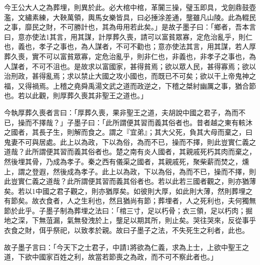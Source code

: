 \begin{pinyinscope}
今王公大人之為葬埋，則異於此。必大棺中棺，革闠三操，璧玉即具，戈劍鼎鼓壺濫，文繡素練，大鞅萬領，輿馬女樂皆具，曰必捶涂差通，壟雖凡山陵。此為輟民之事，靡民之財，不可勝計也，其為毋用若此矣。」是故子墨子曰：「鄉者，吾本言曰，意亦使法1其言，用其謀，計厚葬久喪，請可以富貧眾寡，定危治亂乎，則仁也，義也，孝子之事也，為人謀者，不可不勸也；意亦使法其言，用其謀，若人厚葬久喪，實不可以富貧眾寡，定危治亂乎，則非仁也，非義也，非孝子之事也，為人謀者，不可不沮也。是故求以富國家，甚得貧焉；欲以眾人民，甚得寡焉；欲以治刑政，甚得亂焉；求以禁止大國之攻小國也，而既已不可矣；欲以干上帝鬼神之福，又得禍焉。上稽之堯舜禹湯文武之道而政逆之，下稽之桀紂幽厲之事，猶合節也。若以此觀，則厚葬久喪其非聖王之道也。」

今執厚葬久喪者言曰：「厚葬久喪，果非聖王之道，夫胡說中國之君子，為而不已，操而不擇哉？」子墨子曰：「此所謂便其習而義其俗者也。昔者越之東有輆沐之國者，其長子生，則解而食之。謂之『宜弟』；其大父死，負其大母而棄之，曰鬼妻不可與居處。此上以為政，下以為俗，為而不已，操而不擇，則此豈實仁義之道哉？此所謂便其習而義其俗者也。楚之南有炎人國者，其親戚死朽其肉而棄之，然後埋其骨，乃成為孝子。秦之西有儀渠之國者，其親戚死，聚柴薪而焚之，燻上，謂之登遐，然後成為孝子。此上以為政，下以為俗，為而不已，操而不擇，則此豈實仁義之道哉？此所謂便其習而義其俗者也。若以此若三國者觀之，則亦猶薄矣。若以1中國之君子觀之，則亦猶厚矣。如彼則大厚，如此則大薄，然則葬埋之有節矣。故衣食者，人之生利也，然且猶尚有節；葬埋者，人之死利也，夫何獨無節於此乎。子墨子制為葬埋之法曰：「棺三寸，足以朽骨；衣三領，足以朽肉；掘地之深，下無菹漏，氣無發洩於上，壟足以期其所，則止矣。哭往哭來，反從事乎衣食之財，佴乎祭祀，以致孝於親。故曰子墨子之法，不失死生之利者，此也。

故子墨子言曰：「今天下之士君子，中請1將欲為仁義，求為上士，上欲中聖王之道，下欲中國家百姓之利，故當若節喪之為政，而不可不察此者也。」


\end{pinyinscope}